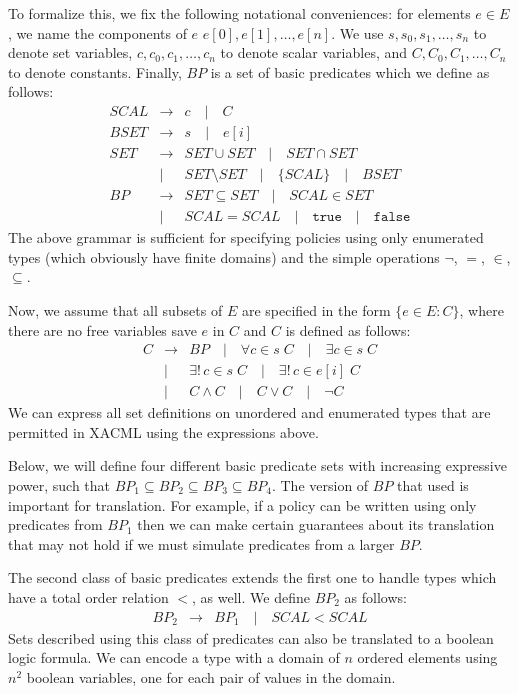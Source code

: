 To formalize this, we fix the following notational conveniences: for
elements $e \in E$, we name the components of $e$ $e[0], e[1], \dots,
e[n]$.  We use $s, s_0, s_1, \dots, s_n$ to denote set variables, $c,
c_0, c_1, \dots, c_n$ to denote scalar variables, and $C, C_0, C_1,
\dots, C_n$ to denote constants.  Finally, $BP$ is a set of basic
predicates which we define as follows:
\begin{eqnarray*}
  SCAL & \rightarrow & c \quad | \quad C \\
  BSET & \rightarrow & s \quad | \quad e[i] \\
  SET & \rightarrow & SET \cup SET \quad | \quad SET \cap SET \\
  & | & SET \setminus SET \quad | \quad \{ SCAL \} \quad | \quad BSET \\
  BP & \rightarrow & SET \subseteq SET \quad | \quad SCAL \in SET \\
  & | & SCAL = SCAL \quad | \quad \texttt{true} \quad | \quad \texttt{false}
\end{eqnarray*}
The above grammar is sufficient for specifying policies 
using only enumerated types (which
obviously have finite domains) and the simple operations $\neg$, $=$,
$\in$, $\subseteq$.

Now, we assume that all subsets of $E$ are specified in the form $\{ e
\in E : C \}$, where there are no free variables save $e$ in $C$ and
$C$ is defined as follows:
\begin{eqnarray*}
  C & \rightarrow & BP \quad | \quad \forall c \in s \; C \quad |
  \quad \exists c \in s \; C \\
  & | & \exists ! \, c \in s \; C \quad | \quad \exists ! \, c \in e[i] \; C \\
  & | & C \wedge C \quad | \quad C \vee C \quad | \quad \neg C
\end{eqnarray*}
We can express all set definitions on unordered and enumerated types
that are permitted in XACML using the expressions above.


Below, we will define four different basic predicate sets with
increasing expressive power, such that $BP_1 \subseteq BP_2 \subseteq
BP_3 \subseteq BP_4$.  The version of $BP$ that used is important for
translation. For example, if a policy can be written using only
predicates from $BP_1$ then we can make certain guarantees about its
translation that may not hold if we must simulate predicates from a
larger $BP$.


The second class of basic predicates extends the first one to handle
types which have a total order relation $<$, as well.  We define
$BP_2$ as follows:
\begin{eqnarray*}
 BP_2 & \rightarrow & BP_1 \quad | \quad SCAL < SCAL 
\end{eqnarray*}
Sets described using this class of predicates can also be translated
to a boolean logic formula. We can encode a type with a domain of $n$
ordered elements using $n^2$ boolean variables, one for each pair of
values in the domain.

